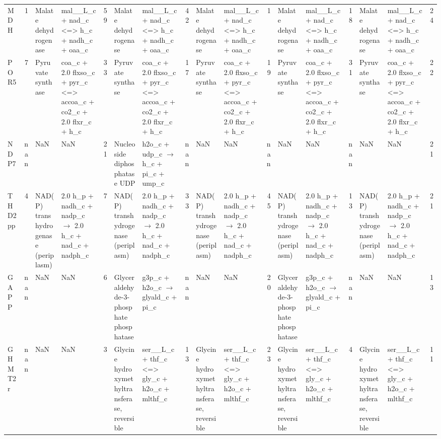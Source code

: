 \begin{tabular}{lrllrllrllrllrllr}
MDH      & 1 &  Malate dehydrogenase &  mal\_\_L\_c + nad\_c <=> h\_c + nadh\_c + oaa\_c & 59 &  Malate dehydrogenase &  mal\_\_L\_c + nad\_c <=> h\_c + nadh\_c + oaa\_c & 42 &  Malate dehydrogenase &  mal\_\_L\_c + nad\_c <=> h\_c + nadh\_c + oaa\_c & 1 &  Malate dehydrogenase &  mal\_\_L\_c + nad\_c <=> h\_c + nadh\_c + oaa\_c & 18 &  Malate dehydrogenase &  mal\_\_L\_c + nad\_c <=> h\_c + nadh\_c + oaa\_c & 24 \\
POR5     & 7 &  Pyruvate synthase &  coa\_c + 2.0 flxso\_c + pyr\_c <=> accoa\_c + co2\_c + 2.0 flxr\_c + h\_c & 33 &  Pyruvate synthase &  coa\_c + 2.0 flxso\_c + pyr\_c <=> accoa\_c + co2\_c + 2.0 flxr\_c + h\_c & 17 &  Pyruvate synthase &  coa\_c + 2.0 flxso\_c + pyr\_c <=> accoa\_c + co2\_c + 2.0 flxr\_c + h\_c & 19 &  Pyruvate synthase &  coa\_c + 2.0 flxso\_c + pyr\_c <=> accoa\_c + co2\_c + 2.0 flxr\_c + h\_c & 31 &  Pyruvate synthase &  coa\_c + 2.0 flxso\_c + pyr\_c <=> accoa\_c + co2\_c + 2.0 flxr\_c + h\_c & 22 \\
NDP7     & nan &  NaN &  NaN & 21 &  Nucleoside diphosphatase  UDP  &  h2o\_c + udp\_c $\rightarrow$ h\_c + pi\_c + ump\_c & nan &  NaN &  NaN & nan &  NaN &  NaN & nan &  NaN &  NaN & 21 \\
THD2pp   & 4 &  NAD(P) transhydrogenase (periplasm) &  2.0 h\_p + nadh\_c + nadp\_c $\rightarrow$ 2.0 h\_c + nad\_c + nadph\_c & 7 &  NAD(P) transhydrogenase (periplasm) &  2.0 h\_p + nadh\_c + nadp\_c $\rightarrow$ 2.0 h\_c + nad\_c + nadph\_c & 33 &  NAD(P) transhydrogenase (periplasm) &  2.0 h\_p + nadh\_c + nadp\_c $\rightarrow$ 2.0 h\_c + nad\_c + nadph\_c & 45 &  NAD(P) transhydrogenase (periplasm) &  2.0 h\_p + nadh\_c + nadp\_c $\rightarrow$ 2.0 h\_c + nad\_c + nadph\_c & 13 &  NAD(P) transhydrogenase (periplasm) &  2.0 h\_p + nadh\_c + nadp\_c $\rightarrow$ 2.0 h\_c + nad\_c + nadph\_c & 21 \\
GAPP     & nan &  NaN &  NaN & 6 &  Glyceraldehyde-3-phosphate phosphatase &  g3p\_c + h2o\_c $\rightarrow$ glyald\_c + pi\_c & nan &  NaN &  NaN & 20 &  Glyceraldehyde-3-phosphate phosphatase &  g3p\_c + h2o\_c $\rightarrow$ glyald\_c + pi\_c & nan &  NaN &  NaN & 13 \\
GHMT2r   & nan &  NaN &  NaN & 3 &  Glycine hydroxymethyltransferase, reversible &  ser\_\_L\_c + thf\_c <=> gly\_c + h2o\_c + mlthf\_c & 13 &  Glycine hydroxymethyltransferase, reversible &  ser\_\_L\_c + thf\_c <=> gly\_c + h2o\_c + mlthf\_c & 23 &  Glycine hydroxymethyltransferase, reversible &  ser\_\_L\_c + thf\_c <=> gly\_c + h2o\_c + mlthf\_c & 4 &  Glycine hydroxymethyltransferase, reversible &  ser\_\_L\_c + thf\_c <=> gly\_c + h2o\_c + mlthf\_c & 11 \\

\end{tabular}
